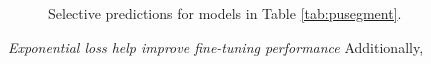 \begin{figure}
\begin{minipage}{\columnwidth}
  \end{minipage}
\caption{Selective predictions for models in Table \ref{tab:pusegment}.}
\label{fig:pusegment}
\end{figure}


\noindent \textit{Exponential loss help improve fine-tuning performance}
Additionally,
